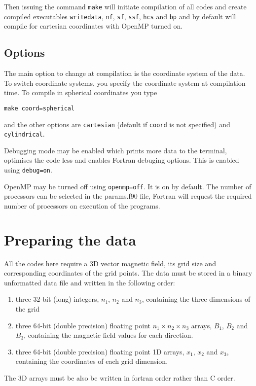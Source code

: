\documentclass[12pt]{article}
\begin{document}
    Then issuing the command \texttt{make} will initiate compilation of all codes and create compiled executables \texttt{writedata}, \texttt{nf}, \texttt{sf}, \texttt{ssf}, \texttt{hcs} and \texttt{bp} and by default will compile for cartesian coordinates with OpenMP turned on.

    \subsection{Options}

      The main option to change at compilation is the coordinate system of the data. To switch coordinate systems, you specify the coordinate system at compilation time. To compile in spherical coordinates you type

      \texttt{make coord=spherical}

      and the other options are \texttt{cartesian} (default if \texttt{coord} is not specified) and \texttt{cylindrical}.

      Debugging mode may be enabled which prints more data to the terminal, optimises the code less and enables Fortran debuging options. This is enabled using \texttt{debug=on}.

      OpenMP may be turned off using \texttt{openmp=off}. It is on by default. The number of processors can be selected in the params.f90 file, Fortran will request the required number of processors on execution of the programs.

  \section{Preparing the data}

    All the codes here require a 3D vector magnetic field, its grid size and corresponding coordinates of the grid points. The data must be stored in a binary unformatted data file and written in the following order:
    \begin{enumerate}
      \item three 32-bit (long) integers, \( n_1 \), \( n_2 \) and \( n_3 \), containing the three dimensions of the grid
      \item three 64-bit (double precision) floating point \( n_1 \times n_2 \times n_3 \) arrays, \( B_1 \), \( B_2 \) and \( B_3 \), containing the magnetic field values for each direction.
      \item three 64-bit (double precision) floating point 1D arrays, \( x_1 \), \( x_2 \) and \( x_3 \), containing the coordinates of each grid dimension.
    \end{enumerate}
    The 3D arrays must be also be written in fortran order rather than C order.
\end{document}
